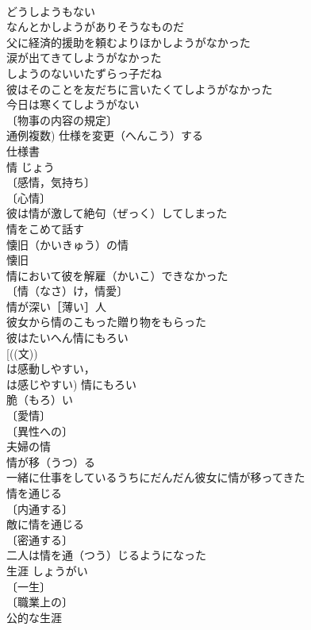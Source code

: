 \documentclass[8pt]{extreport}
\begin{document}
\begin{CJK}{UTF8}{min}
\\	どうしようもない 
\\	なんとかしようがありそうなものだ 
\\	父に経済的援助を頼むよりほかしようがなかった 
\\	涙が出てきてしようがなかった 
\\	しようのないいたずらっ子だね 
\\	彼はそのことを友だちに言いたくてしようがなかった 
\\	今日は寒くてしようがない 
\\	〔物事の内容の規定〕
\\	通例複数) 仕様を変更（へんこう）する 
\\	仕様書 
\\	情	じょう	
\\	〔感情，気持ち〕
\\	〔心情〕
\\	彼は情が激して絶句（ぜっく）してしまった 
\\	情をこめて話す 
\\	懐旧（かいきゅう）の情 
\\	懐旧　
\\	情において彼を解雇（かいこ）できなかった 
\\	〔情（なさ）け，情愛〕
\\	情が深い［薄い］人 
\\	彼女から情のこもった贈り物をもらった 
\\	彼はたいへん情にもろい 
\\	[((文)) 
\\	は感動しやすい，
\\	は感じやすい) 情にもろい　
\\	脆（もろ）い　
\\	〔愛情〕
\\	〔異性への〕
\\	夫婦の情 
\\	情が移（うつ）る　
\\	一緒に仕事をしているうちにだんだん彼女に情が移ってきた 
\\	情を通じる 
\\	〔内通する〕 
\\	敵に情を通じる 
\\	〔密通する〕
\\	二人は情を通（つう）じるようになった 
\\	生涯	しょうがい	
\\	〔一生〕
\\	〔職業上の〕
\\	公的な生涯 

\end{CJK}
\end{document}
